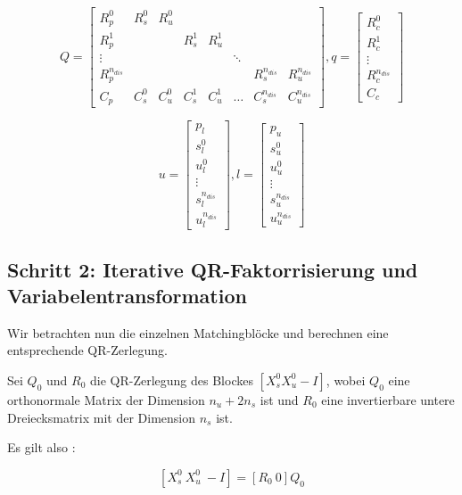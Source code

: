 $$Q=\left[ \begin{array}{cccccccc}
R_p^0 & R_s^0 & R_u^0 &  &  &  &  &  \\ 
R_p^1 &  &  & R_s^1 & R_u^1 &  &  &  \\ 
\vdots &  &  &  &  & \ddots &  &  \\ 
R_p^{n_{dis}} &  &  &  &  &  & R_s^{n_{dis}} & R_u^{n_{dis}} \\ 
C_p & C_s^0 & C_u^0 & C_s^1 & C_u^1 & \hdots & C_s^{n_{dis}} & C_u^{n_{dis}}
\end{array}  \right],
q= \left[ \begin{array}{c}
R_c^0 \\ 
R_c^1 \\ 
\vdots \\ 
R_c^{n_{dis}} \\ 
C_c
\end{array}  \right]$$

$$u= \left[ \begin{array}{c}
p_l \\ 
s^0_l \\ 
u^0_l \\ 
\vdots \\ 
s^{n_{dis}}_l \\ 
u^{n_{dis}}_l
\end{array} \right],
l= \left[ \begin{array}{c}
p_u \\ 
s^0_u \\ 
u^0_u \\ 
\vdots \\ 
s^{n_{dis}}_u \\ 
u^{n_{dis}}_u
\end{array} \right]$$

\subsection*{Schritt 2: Iterative QR-Faktorrisierung und Variabelentransformation}

Wir betrachten nun die einzelnen Matchingblöcke und berechnen eine entsprechende QR-Zerlegung. 

Sei $Q_0$ und $R_0$ die QR-Zerlegung des Blockes $[X_s^0 X_u^0 -I]$, wobei $Q_0$ eine orthonormale Matrix der Dimension $n_u+2n_s$ ist und $R_0$ eine invertierbare untere Dreiecksmatrix mit der Dimension $n_s$ ist.

Es gilt also :

$$\left[X_s^0 \  X_u^0 \ -I \right]= \left[R_0 \ 0 \right]Q_0$$

